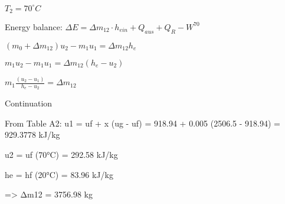 \( T_2 = 70^\circ C \)  

Energy balance:  
\( \Delta E = \Delta m_{12} \cdot h_{ein} + Q_{aus} + Q_R - W^{70} \)  

\( (m_0 + \Delta m_{12}) u_2 - m_1 u_1 = \Delta m_{12} h_e \)  

\( m_1 u_2 - m_1 u_1 = \Delta m_{12} (h_e - u_2) \)  

\( m_1 \frac{(u_2 - u_1)}{h_e - u_2} = \Delta m_{12} \)

Continuation  

From Table A2:  
u1 = uf + x (ug - uf) = 918.94 + 0.005 (2506.5 - 918.94)  
= 929.3778 kJ/kg  

u2 = uf (70°C) = 292.58 kJ/kg  

he = hf (20°C) = 83.96 kJ/kg  

=> Δm12 = 3756.98 kg